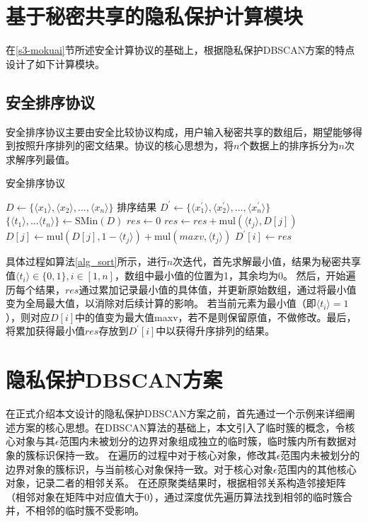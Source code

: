 \section{基于秘密共享的隐私保护计算模块}
\label{s4-subpro}
在\ref{s3-mokuai}节所述安全计算协议的基础上，根据隐私保护DBSCAN方案的特点设计了如下计算模块。
\subsection{安全排序协议}
安全排序协议主要由安全比较协议构成，用户输入秘密共享的数组后，期望能够得到按照升序排列的密文结果。协议的核心思想为，将$ n $个数据上的排序拆分为$ n $次求解序列最值。
\begin{algorithm}[htbp]
	\renewcommand{\algorithmicrequire}{\textbf{输入:}}
	\renewcommand{\algorithmicensure}{\textbf{输出:}}
	\caption{安全排序协议}
	\label{alg_sort}
	\begin{algorithmic}[1]
		\REQUIRE $ D \leftarrow \{\langle  x_1 \rangle, \langle  x_2 \rangle,...,\langle  x_n \rangle\} $
		\ENSURE 排序结果 $ D^{\prime} \leftarrow \{\langle  x^{\prime}_1 \rangle, \langle  x^{\prime}_2 \rangle,...,\langle  x^{\prime}_n \rangle\} $
		\STATE $ \{\langle  t_1 \rangle,...\langle  t_n \rangle\} \leftarrow \text{SMin}(D)$
		\STATE $ res \leftarrow 0 $
		\STATE $ res \leftarrow res + \text{mul}(\langle  t_j \rangle, D[j]) $
		\STATE $ D[j] \leftarrow \text{mul}(D[j],1-\langle  t_j \rangle) + \text{mul}(maxv, \langle  t_j \rangle)$
		\ENDFOR
		\STATE $ D^{\prime}[i] \leftarrow res $
		\ENDFOR
	\end{algorithmic}
\end{algorithm}

具体过程如算法\ref{alg_sort}所示，进行$ n $次迭代，首先求解最小值，结果为秘密共享值$ \langle t_i \rangle \in \{0,1\}, i\in[1,n] $，数组中最小值的位置为1，其余均为0。
然后，开始遍历每个结果，$ res $通过累加记录最小值的具体值，并更新原始数组，通过将最小值变为全局最大值，以消除对后续计算的影响。
若当前元素为最小值（即$\langle t_i \rangle=1  $ ），则对应$ D[i] $中的值变为最大值maxv，若不是则保留原值，不做修改。最后，将累加获得最小值$ res $存放到$ D^{\prime}[i] $中以获得升序排列的结果。


\section{隐私保护DBSCAN方案}
\label{s4-t1}
在正式介绍本文设计的隐私保护DBSCAN方案之前，首先通过一个示例来详细阐述方案的核心思想。在DBSCAN算法的基础上，本文引入了临时簇的概念，令核心对象与其$ \epsilon $范围内未被划分的边界对象组成独立的临时簇，临时簇内所有数据对象的簇标识保持一致。
在遍历的过程中对于核心对象，修改其$ \epsilon $范围内未被划分的边界对象的簇标识，与当前核心对象保持一致。对于核心对象$ \epsilon $范围内的其他核心对象，记录二者的相邻关系。
在还原聚类结果时，根据相邻关系构造邻接矩阵（相邻对象在矩阵中对应值大于0），通过深度优先遍历算法找到相邻的临时簇合并，不相邻的临时簇不受影响。


